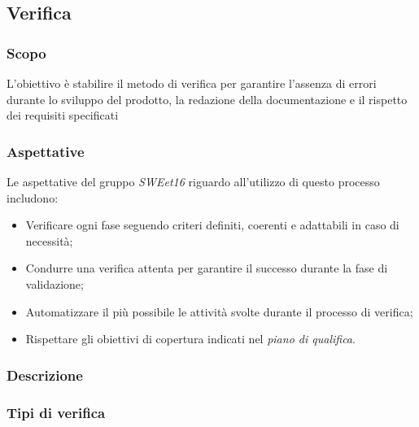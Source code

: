 
\subsection{Verifica}
\subsubsection{Scopo}
L'obiettivo è stabilire il metodo di verifica per garantire l'assenza
di errori durante lo sviluppo del prodotto, la redazione della documentazione
e il rispetto dei requisiti specificati
\subsubsection{Aspettative}
Le aspettative del gruppo \emph{SWEet16} riguardo all'utilizzo di questo processo includono:
\begin{itemize}
    \item Verificare ogni fase seguendo criteri definiti, coerenti e adattabili in caso di necessità;
    \item Condurre una verifica attenta per garantire il successo durante la fase di validazione;
    \item Automatizzare il più possibile le attività svolte durante il processo di verifica;
    \item Rispettare gli obiettivi di copertura indicati nel \emph{piano di qualifica}.
\end{itemize}
\subsubsection{Descrizione}

\subsubsection{Tipi di verifica}



